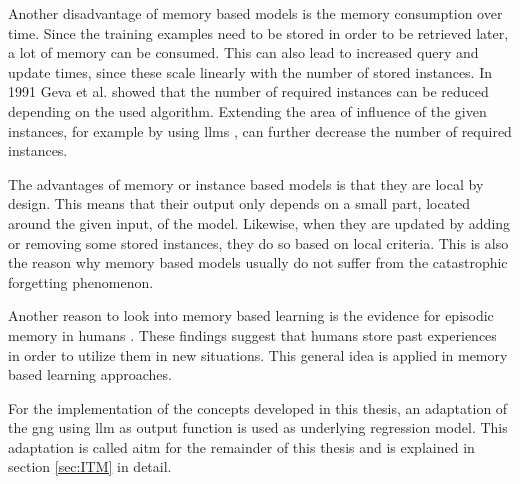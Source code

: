 Another disadvantage of memory based models is the memory consumption over time. Since the training examples need to be stored in order to be retrieved later, a lot of memory can be consumed. This can also lead to increased query and update times, since these scale linearly with the number of stored instances. In 1991 Geva et al. \cite{protReduction} showed that the number of required instances can be reduced depending on the used algorithm. Extending the area of influence of the given instances, for example by using \glspl{llm} \cite{LLM}, can further decrease the number of required instances.

The advantages of memory or instance based models is that they are local by design. This means that their output only depends on a small part, located around the given input, of the model. Likewise, when they are updated by adding or removing some stored instances, they do so based on local criteria. This is also the reason why memory based models usually do not suffer from the catastrophic forgetting phenomenon.

Another reason to look into memory based learning is the evidence for episodic memory in humans \cite{tulving2002episodic}. These findings suggest that humans store past experiences in order to utilize them in new situations. This general idea is applied in memory based learning approaches.

For the implementation of the concepts developed in this thesis, an adaptation of the \gls{gng} using \gls{llm} as output function is used as underlying regression model. This adaptation is called \gls{aitm} for the remainder of this thesis and is explained in section \ref{sec:ITM} in detail.

%
%
%

